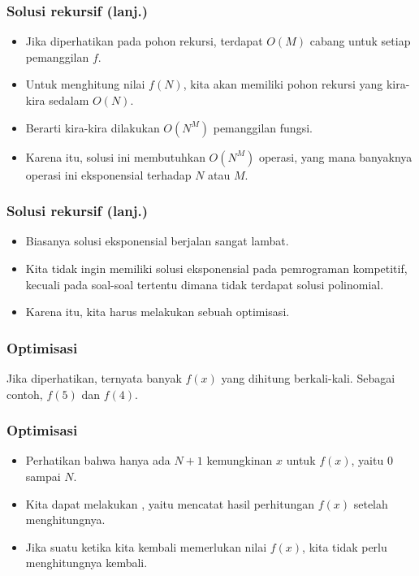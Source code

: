 \begin{frame}
\frametitle{Solusi rekursif (lanj.)}
\begin{itemize}
  \item Jika diperhatikan pada pohon rekursi, terdapat $O(M)$ cabang untuk setiap pemanggilan $f$.
  \item Untuk menghitung nilai $f(N)$, kita akan memiliki pohon rekursi yang kira-kira sedalam $O(N)$.
  \item Berarti kira-kira dilakukan $O(N^M)$ pemanggilan fungsi.
  \item Karena itu, solusi ini membutuhkan $O(N^M)$ operasi, yang mana banyaknya operasi ini eksponensial terhadap $N$ atau $M$.
\end{itemize}
\end{frame}

\begin{frame}
\frametitle{Solusi rekursif (lanj.)}
\begin{itemize}
  \item Biasanya solusi eksponensial berjalan sangat lambat.
  \item Kita tidak ingin memiliki solusi eksponensial pada pemrograman kompetitif, kecuali pada soal-soal tertentu dimana tidak terdapat solusi polinomial. 
  \item Karena itu, kita harus melakukan sebuah optimisasi.
\end{itemize}
\end{frame}

\begin{frame}
\frametitle{Optimisasi}
Jika diperhatikan, ternyata banyak $f(x)$ yang dihitung berkali-kali. Sebagai contoh, $f(5)$ dan $f(4)$.
\begin{center}
\end{center}
\end{frame}

\begin{frame}
\frametitle{Optimisasi}
\begin{itemize}
  \item Perhatikan bahwa hanya ada $N + 1$ kemungkinan $x$ untuk $f(x)$, yaitu $0$ sampai $N$.
  
  \item Kita dapat melakukan , yaitu mencatat hasil perhitungan $f(x)$ setelah menghitungnya.
  \item Jika suatu ketika kita kembali memerlukan nilai $f(x)$, kita tidak perlu menghitungnya kembali.
\end{itemize}
\end{frame}


